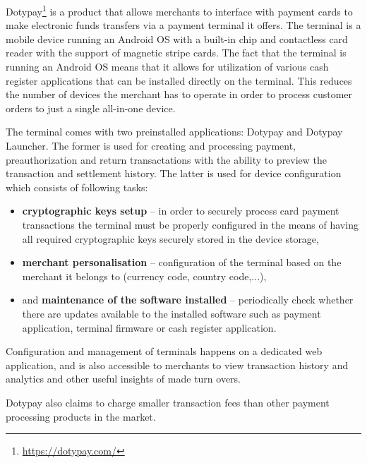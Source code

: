 \documentclass[12pt, a4paper]{article}
\begin{document}
Dotypay\footnote{\url{https://dotypay.com/}} is a product that allows merchants to interface with payment cards to make electronic funds transfers via a payment terminal it offers.
The terminal is a mobile device running an Android OS with a built-in chip and contactless card reader with the support of magnetic stripe cards.
The fact that the terminal is running an Android OS means that it allows for utilization of various cash register applications that can be installed directly on the terminal. 
This reduces the number of devices the merchant has to operate in order to process customer orders to just a single all-in-one device.

The terminal comes with two preinstalled applications: Dotypay and Dotypay Launcher. The former is used for creating and processing payment, preauthorization and return transactations with the ability to preview the transaction and settlement history. The latter is used for device configuration which consists of following tasks:

\begin{itemize}
    \item \textbf{cryptographic keys setup} -- in order to securely process card payment transactions the terminal must be properly configured in the means of having all required cryptographic keys securely stored in the device storage,
    \item \textbf{merchant personalisation} -- configuration of the terminal based on the merchant it belongs to (currency code, country code,...),
    \item and \textbf{maintenance of the software installed} -- periodically check whether there are updates available to the installed software such as payment application, terminal firmware or cash register application.

\end{itemize}

Configuration and management of terminals happens on a dedicated web application, and is also accessible to merchants to view transaction history and analytics and other useful insights of made turn overs.

Dotypay also claims to charge smaller transaction fees than other payment processing products in the market.
\end{document}
